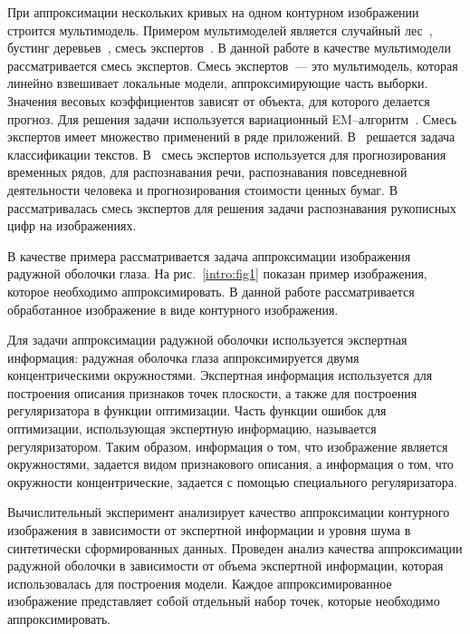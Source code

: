 \documentclass[12pt]{a&t}
\begin{document}
При аппроксимации нескольких кривых на одном контурном изображении строится мультимодель. Примером мультимоделей является случайный лес~\cite{Ishwaran2012}, бустинг деревьев~\cite{Tianqi2016}, смесь экспертов~\cite{Yuksel2012}.
В данной работе в качестве мультимодели рассматривается смесь экспертов.
Смесь экспертов~--- это мультимодель, которая линейно взвешивает локальные модели, аппроксимирующие часть выборки.
Значения весовых коэффициентов зависят от объекта, для которого делается прогноз.
Для решения задачи используется вариационный EM--алгоритм~\cite{Dempster1977, Ebrahimpour2009, Peng1996, Grabovoy2021}.
Смесь экспертов имеет множество применений в ряде приложений.
В~\cite{Estabrooks2001} решается задача классификации текстов.
В~\cite{Cheung1995, Weigend2000, Cao2003, Mossavat2010, Sminchisescu2007, Tuerk2001, Yumlu2003} смесь экспертов используется для прогнозирования временных рядов, для распознавания речи, распознавания повседневной деятельности человека и прогнозирования стоимости ценных бумаг.
В~\cite{Ebrahimpour2009} рассматривалась смесь экспертов для решения задачи распознавания рукописных цифр на изображениях.

В качестве примера рассматривается задача аппроксимации изображения радужной оболочки глаза. На рис.~\ref{intro:fig1} показан пример изображения, которое необходимо аппроксимировать.
В данной работе рассматривается обработанное изображение в виде контурного изображения.

Для задачи аппроксимации радужной оболочки используется экспертная информация: радужная оболочка глаза аппроксимируется двумя концентрическими окружностями.
Экспертная информация используется для построения описания признаков точек плоскости, а также для построения регуляризатора в функции оптимизации.
Часть функции ошибок для оптимизации, использующая экспертную информацию, называется регуляризатором.
Таким образом, информация о том, что изображение является окружностями, задается видом признакового описания, а информация о том, что окружности концентрические, задается с помощью специального регуляризатора.

Вычислительный эксперимент анализирует качество аппроксимации контурного изображения в зависимости от экспертной информации и уровня шума в синтетически сформированных данных. Проведен анализ качества аппроксимации радужной оболочки в зависимости от объема экспертной информации, которая использовалась для построения модели.
Каждое аппроксимированное изображение представляет собой отдельный набор точек, которые необходимо аппроксимировать.
\end{document}
